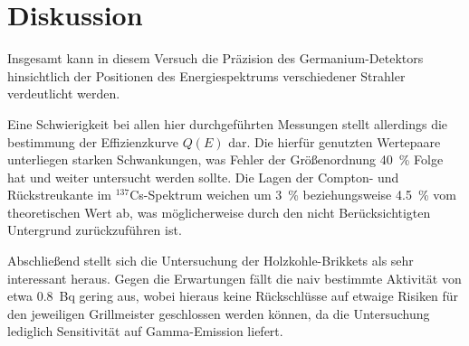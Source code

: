 \section{Diskussion}
\label{sec:diskussion}
Insgesamt kann in diesem Versuch die Präzision des Germanium-Detektors
hinsichtlich
der Positionen des Energiespektrums verschiedener Strahler verdeutlicht
werden.

Eine Schwierigkeit bei allen hier durchgeführten Messungen stellt allerdings
die bestimmung der Effizienzkurve $Q(E)$ dar.
Die hierfür genutzten Wertepaare unterliegen starken Schwankungen, was Fehler
der Größenordnung \SI{40}{\percent} Folge hat und weiter untersucht werden
sollte.
Die Lagen der Compton- und Rückstreukante im $^{137}$Cs-Spektrum
weichen um \SI{3}{\percent} beziehungsweise \SI{4.5}{\percent}
vom theoretischen Wert ab, was möglicherweise durch den nicht Berücksichtigten
Untergrund zurückzuführen ist.

Abschließend stellt sich die Untersuchung der Holzkohle-Brikkets als sehr
interessant heraus. Gegen die Erwartungen fällt die naiv bestimmte Aktivität
von etwa \SI{0.8}{\becquerel} gering aus, wobei hieraus keine Rückschlüsse auf
etwaige Risiken für den jeweiligen Grillmeister geschlossen werden können,
da die Untersuchung lediglich Sensitivität auf Gamma-Emission liefert.
